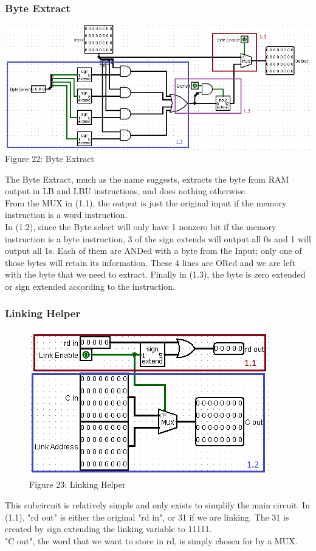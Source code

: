 \documentclass{article}
\begin{document}
\subsubsection{Byte Extract}
\begin{center}
\includegraphics[width=.9\textwidth]{ByteExtract.png} \\
Figure 22: Byte Extract
\end{center}
 The Byte Extract, much as the name suggests, extracts the byte from RAM output in LB and LBU instructions, and does nothing otherwise.\\
 From the MUX in (1.1), the output is just the original input if the memory instruction is a word instruction. \\ 
 In (1.2), since the Byte select will only have 1 nonzero bit if the memory instruction is a byte instruction, 3 of the sign extends will output all 0s and 1 will output all 1s. Each of them are ANDed with a byte from the Input; only one of those bytes will retain its information. These 4 lines are ORed and we are left with the byte that we need to extract. Finally in (1.3), the byte is zero extended or sign extended according to the instruction.
 
\subsubsection{Linking Helper}
\begin{figure}
\vspace{-1cm}
\begin{center}
\includegraphics[width=.4\textwidth]{Linking.png}\\
Figure 23: Linking Helper
\end{center}
\vspace{-2cm}
\end{figure}
This subcircuit is relatively simple and only exists to simplify the main circuit. In (1.1), "rd out" is either the original "rd in", or 31 if we are linking. The 31 is created by sign extending the linking variable to 11111.\\
"C out", the word that we want to store in rd, is simply chosen for by a MUX.
\end{document}
